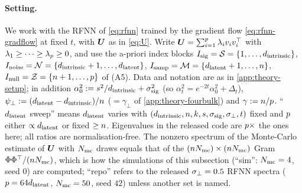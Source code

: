 \paragraph{Setting.}
We work with the RFNN of \eqref{eq:rfnn} trained by the gradient flow \eqref{eq:rfnn-gradflow} at fixed $t$, with $\bm{U}$ as in \eqref{eq:U}. Write $\bm{U}=\sum_{i=1}^{p}\lambda_iv_iv_i^\top$ with $\lambda_1\ge\dots\ge\lambda_{p}\ge0$, and use the a-priori index blocks $I_{\rm sig}=\mathcal S=\{1,\dots,d_{\mathrm{intrinsic}}\}$, $I_{\rm noise}=\mathcal N=\{d_{\mathrm{intrinsic}}+1,\dots,d_{\mathrm{latent}}\}$, $I_{\rm samp}=\mathcal M=\{d_{\mathrm{latent}}+1,\dots,n\}$, $I_{\rm null}=\mathcal Z=\{n+1,\dots,p\}$ of (A5). Data and notation are as in \cref{app:theory-setup}; in addition $\alpha_0^2:=s^2/d_{\mathrm{intrinsic}}+\sigma_{\mathrm{sig}}^2$ (so $\alpha_t^2=e^{-2t}\alpha_0^2+\Delta_t$), $\psi_\perp:=(d_{\mathrm{latent}}-d_{\mathrm{intrinsic}})/n$ ($=\gamma_\perp$ of \cref{app:theory-fourbulk}) and $\gamma:=n/p$. ``$d_{\mathrm{latent}}$ sweep'' means $d_{\mathrm{latent}}$ varies with $(d_{\mathrm{intrinsic}},n,k,s,\sigma_{\mathrm{sig}},\sigma_{\perp},t)$ fixed and $p$ either $\propto d_{\mathrm{latent}}$ or fixed $\ge n$. Eigenvalues in the released code are $p\times$ the ones here; all ratios are normalisation-free. The nonzero spectrum of the Monte-Carlo estimate of $\bm{U}$ with $N_{\rm mc}$ draws equals that of the $(n N_{\rm mc})\times(n N_{\rm mc})$ Gram $\Phi\Phi^\top/(n N_{\rm mc})$, which is how the simulations of this subsection (``sim'': $N_{\rm mc}=4$, seed $0$) are computed; ``repo'' refers to the released $\sigma_{\perp}=0.5$ RFNN spectra ($p=64d_{\mathrm{latent}}$, $N_{\rm mc}=50$, seed $42$) unless another set is named.

